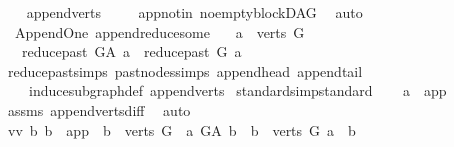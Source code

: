 \begin{isabellebody}
%
\isadelimproof
\ \ %
\endisadelimproof
%
\isatagproof
{}\isamarkupfalse%
\ append{\isacharunderscore}{\kern0pt}verts\ \isanewline
\ \ \isamarkupfalse%
\ app{\isacharunderscore}{\kern0pt}notin\ no{\isacharunderscore}{\kern0pt}empty{\isacharunderscore}{\kern0pt}blockDAG\ \isamarkupfalse%
\ auto%
\endisatagproof
{\isafoldproof}%
%
\isadelimproof
\ \ \isanewline
%
\endisadelimproof
\isanewline
{}\isamarkupfalse%
\ {\isacharparenleft}{\kern0pt}\ Append{\isacharunderscore}{\kern0pt}One{\isacharparenright}{\kern0pt}\ append{\isacharunderscore}{\kern0pt}reduce{\isacharunderscore}{\kern0pt}some{\isacharcolon}{\kern0pt}\isanewline
\ \ \ {\isachardoublequoteopen}a\ {\isasymin}\ verts\ G{\isachardoublequoteclose}\isanewline
\ \ \ {\isachardoublequoteopen}reduce{\isacharunderscore}{\kern0pt}past\ G{\isacharunderscore}{\kern0pt}A\ a\ {\isacharequal}{\kern0pt}\ reduce{\isacharunderscore}{\kern0pt}past\ G\ a{\isachardoublequoteclose}\isanewline
%
\isadelimproof
\ \ %
\endisadelimproof
%
\isatagproof
{}\isamarkupfalse%
\ reduce{\isacharunderscore}{\kern0pt}past{\isachardot}{\kern0pt}simps\ past{\isacharunderscore}{\kern0pt}nodes{\isachardot}{\kern0pt}simps\ append{\isacharunderscore}{\kern0pt}head\ append{\isacharunderscore}{\kern0pt}tail\ \isanewline
\ \ \ \ induce{\isacharunderscore}{\kern0pt}subgraph{\isacharunderscore}{\kern0pt}def\ append{\isacharunderscore}{\kern0pt}verts\ \isanewline
{}\isamarkupfalse%
{\isacharparenleft}{\kern0pt}standard{\isacharcomma}{\kern0pt}simp{\isacharcomma}{\kern0pt}standard{\isacharparenright}{\kern0pt}\isanewline
\ \ \isamarkupfalse%
\ {\isachardoublequoteopen}a\ {\isasymnoteq}\ app{\isachardoublequoteclose}\ \isamarkupfalse%
\ assms{\isacharparenleft}{\kern0pt}{}{\isacharparenright}{\kern0pt}\ append{\isacharunderscore}{\kern0pt}verts{\isacharunderscore}{\kern0pt}diff\ \isamarkupfalse%
\ auto\isanewline
\ \ \isamarkupfalse%
\ \isamarkupfalse%
\ vv{\isacharcolon}{\kern0pt}\ {\isachardoublequoteopen}{\isacharbraceleft}{\kern0pt}b{\isachardot}{\kern0pt}\ {\isacharparenleft}{\kern0pt}b\ {\isacharequal}{\kern0pt}\ app\ {\isasymor}\ b\ {\isasymin}\ verts\ G{\isacharparenright}{\kern0pt}\ {\isasymand}\ a\ {\isasymrightarrow}\isactrlsup {\isacharplus}{\kern0pt}\isactrlbsub G{\isacharunderscore}{\kern0pt}A\isactrlesub \ b{\isacharbraceright}{\kern0pt}\ {\isacharequal}{\kern0pt}\ {\isacharbraceleft}{\kern0pt}b\ {\isasymin}\ verts\ G{\isachardot}{\kern0pt}\ a\ {\isasymrightarrow}\isactrlsup {\isacharplus}{\kern0pt}\ b{\isacharbraceright}{\kern0pt}{\isachardoublequoteclose}\ \isanewline

\end{isabellebody}
